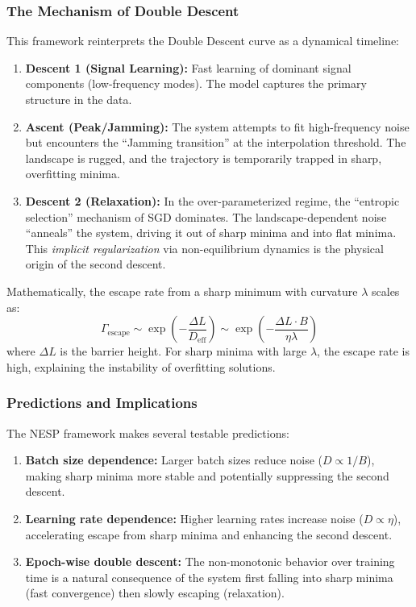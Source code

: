 \subsubsection{The Mechanism of Double Descent}

This framework reinterprets the Double Descent curve as a dynamical timeline:

\begin{enumerate}[topsep=1pt,itemsep=1pt]
    \item \textbf{Descent 1 (Signal Learning):} Fast learning of dominant signal components (low-frequency modes). The model captures the primary structure in the data.
    
    \item \textbf{Ascent (Peak/Jamming):} The system attempts to fit high-frequency noise but encounters the ``Jamming transition'' at the interpolation threshold. The landscape is rugged, and the trajectory is temporarily trapped in sharp, overfitting minima.
    
    \item \textbf{Descent 2 (Relaxation):} In the over-parameterized regime, the ``entropic selection'' mechanism of SGD dominates. The landscape-dependent noise ``anneals'' the system, driving it out of sharp minima and into flat minima. This \textit{implicit regularization} via non-equilibrium dynamics is the physical origin of the second descent.
\end{enumerate}

Mathematically, the escape rate from a sharp minimum with curvature $\lambda$ scales as:
\begin{equation}
    \Gamma_{\text{escape}} \sim \exp\left(-\frac{\Delta L}{D_{\text{eff}}}\right) \sim \exp\left(-\frac{\Delta L \cdot B}{\eta \lambda}\right)
\end{equation}
where $\Delta L$ is the barrier height. For sharp minima with large $\lambda$, the escape rate is high, explaining the instability of overfitting solutions.

\subsubsection{Predictions and Implications}

The NESP framework makes several testable predictions:

\begin{enumerate}[topsep=1pt,itemsep=1pt]
    \item \textbf{Batch size dependence:} Larger batch sizes reduce noise ($D \propto 1/B$), making sharp minima more stable and potentially suppressing the second descent.
    
    \item \textbf{Learning rate dependence:} Higher learning rates increase noise ($D \propto \eta$), accelerating escape from sharp minima and enhancing the second descent.
    
    \item \textbf{Epoch-wise double descent:} The non-monotonic behavior over training time is a natural consequence of the system first falling into sharp minima (fast convergence) then slowly escaping (relaxation).
\end{enumerate}

